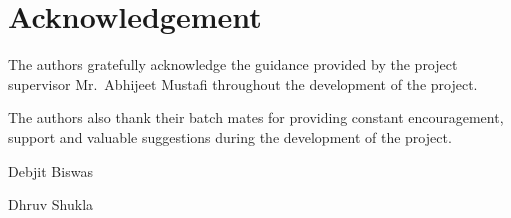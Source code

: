 \chapter*{Acknowledgement}

The authors gratefully acknowledge the guidance provided by the project supervisor 
Mr.~Abhijeet Mustafi throughout the development of the project.

The authors also thank their batch mates for providing constant encouragement, 
support and valuable suggestions during the development of the project.

{\flushright Debjit Biswas \par}
\vspace{-1\baselineskip}
{\flushright Dhruv Shukla \par}
